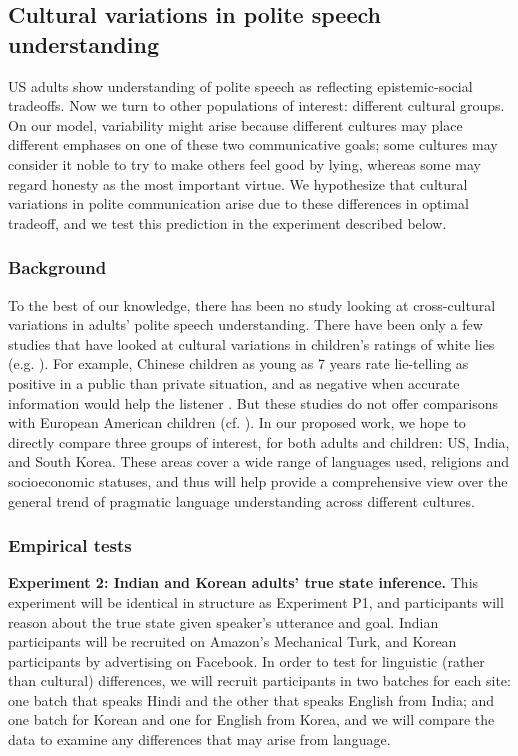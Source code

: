 \subsection{Cultural variations in polite speech understanding}
\label{sec:culture}

US adults show understanding of polite speech as reflecting epistemic-social tradeoffs. Now we turn to other populations of interest: different cultural groups. On our model, variability might arise because different cultures may place different emphases on one of these two communicative goals; some cultures may consider it noble to try to make others feel good by lying, whereas some may regard honesty as the most important virtue. We hypothesize that cultural variations in polite communication arise due to these differences in optimal tradeoff, and we test this prediction in the experiment described below. 

\subsubsection{Background} 

To the best of our knowledge, there has been no study looking at cross-cultural variations in adults' polite speech understanding. There have been only a few studies that have looked at cultural variations in children's ratings of white lies (e.g. \citealt{fu2007, ma2011}). For example, Chinese children as young as 7 years rate lie-telling as positive in a public than private situation, and as negative when accurate information would help the listener \citep{ma2011}. But these studies do not offer comparisons with European American children (cf. \citealt{lee1997}). In our proposed work, we hope to directly compare three groups of interest, for both adults and children: US, India, and South Korea. These areas cover a wide range of languages used, religions and socioeconomic statuses, and thus will help provide a comprehensive view over the general trend of pragmatic language understanding across different cultures.


\subsubsection{Empirical tests}


{\bf Experiment 2: Indian and Korean adults' true state inference.} 
This experiment will be identical in structure as Experiment P1, and participants will reason about the true state given speaker's utterance and goal. Indian participants will be recruited on Amazon's Mechanical Turk, and Korean participants by advertising on Facebook. In order to test for linguistic (rather than cultural) differences, we will recruit participants in two batches for each site: one batch that speaks Hindi and the other that speaks English from India; and one batch for Korean and one for English from Korea, and we will compare the data to examine any differences that may arise from language.  

